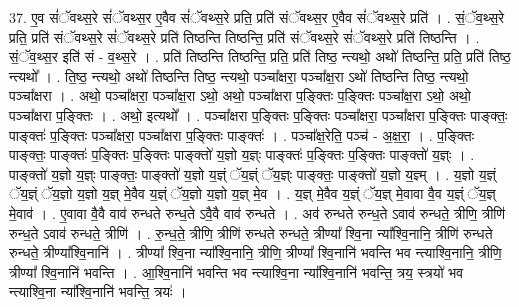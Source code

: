 \documentclass[17pt]{extarticle}
\begin{document}
37. ए॒व सं॑ॅवथ्स॒रे सं॑ॅवथ्स॒र ए॒वैव सं॑ॅवथ्स॒रे प्रति॒ प्रति॑ संॅवथ्स॒र ए॒वैव सं॑ॅवथ्स॒रे प्रति॑ । . सं॒ॅव॒थ्स॒रे प्रति॒ प्रति॑ संॅवथ्स॒रे सं॑ॅवथ्स॒रे प्रति॑ तिष्ठन्ति तिष्ठन्ति॒ प्रति॑ संॅवथ्स॒रे सं॑ॅवथ्स॒रे प्रति॑ तिष्ठन्ति । . सं॒ॅव॒थ्स॒र इति॑ सं - व॒थ्स॒रे । . प्रति॑ तिष्ठन्ति तिष्ठन्ति॒ प्रति॒ प्रति॑ तिष्ठ॒ न्त्यथो॒ अथो॑ तिष्ठन्ति॒ प्रति॒ प्रति॑ तिष्ठ॒ न्त्यथो᳚ । . ति॒ष्ठ॒ न्त्यथो॒ अथो॑ तिष्ठन्ति तिष्ठ॒ न्त्यथो॒ पञ्चा᳚क्षरा॒ पञ्चा᳚क्ष॒रा ऽथो॑ तिष्ठन्ति तिष्ठ॒ न्त्यथो॒ पञ्चा᳚क्षरा । . अथो॒ पञ्चा᳚क्षरा॒ पञ्चा᳚क्ष॒रा ऽथो॒ अथो॒ पञ्चा᳚क्षरा प॒ङ्क्तिः प॒ङ्क्तिः पञ्चा᳚क्ष॒रा ऽथो॒ अथो॒ पञ्चा᳚क्षरा प॒ङ्क्तिः । . अथो॒ इत्यथो᳚ । . पञ्चा᳚क्षरा प॒ङ्क्तिः प॒ङ्क्तिः पञ्चा᳚क्षरा॒ पञ्चा᳚क्षरा प॒ङ्क्तिः पाङ्क्तः॒ पाङ्क्तः॑ प॒ङ्क्तिः पञ्चा᳚क्षरा॒ पञ्चा᳚क्षरा प॒ङ्क्तिः पाङ्क्तः॑ । . पञ्चा᳚क्ष॒रेति॒ पञ्च॑ - अ॒क्ष॒रा॒ । . प॒ङ्क्तिः पाङ्क्तः॒ पाङ्क्तः॑ प॒ङ्क्तिः प॒ङ्क्तिः पाङ्क्तो॑ य॒ज्ञो य॒ज्ञ्ः पाङ्क्तः॑ प॒ङ्क्तिः प॒ङ्क्तिः पाङ्क्तो॑ य॒ज्ञ्ः । . पाङ्क्तो॑ य॒ज्ञो य॒ज्ञ्ः पाङ्क्तः॒ पाङ्क्तो॑ य॒ज्ञो य॒ज्ञ्ं ॅय॒ज्ञ्ं ॅय॒ज्ञ्ः पाङ्क्तः॒ पाङ्क्तो॑ य॒ज्ञो य॒ज्ञ्म् । . य॒ज्ञो य॒ज्ञ्ं ॅय॒ज्ञ्ं ॅय॒ज्ञो य॒ज्ञो य॒ज्ञ् मे॒वैव य॒ज्ञ्ं ॅय॒ज्ञो य॒ज्ञो य॒ज्ञ् मे॒व । . य॒ज्ञ् मे॒वैव य॒ज्ञ्ं ॅय॒ज्ञ् मे॒वावा वै॒व य॒ज्ञ्ं ॅय॒ज्ञ् मे॒वाव॑ । . ए॒वावा वै॒वै वाव॑ रुन्धते रुन्ध॒ते ऽवै॒वै वाव॑ रुन्धते । . अव॑ रुन्धते रुन्ध॒ते ऽवाव॑ रुन्धते॒ त्रीणि॒ त्रीणि॑ रुन्ध॒ते ऽवाव॑ रुन्धते॒ त्रीणि॑ । . रु॒न्ध॒ते॒ त्रीणि॒ त्रीणि॑ रुन्धते रुन्धते॒ त्रीण्या᳚ श्वि॒ना न्या᳚श्वि॒नानि॒ त्रीणि॑ रुन्धते रुन्धते॒ त्रीण्या᳚श्वि॒नानि॑ । . त्रीण्या᳚ श्वि॒ना न्या᳚श्वि॒नानि॒ त्रीणि॒ त्रीण्या᳚ श्वि॒नानि॑ भवन्ति भव न्त्याश्वि॒नानि॒ त्रीणि॒ त्रीण्या᳚ श्वि॒नानि॑ भवन्ति । . आ॒श्वि॒नानि॑ भवन्ति भव न्त्याश्वि॒ना न्या᳚श्वि॒नानि॑ भवन्ति॒ त्रय॒ स्त्रयो॑ भव न्त्याश्वि॒ना न्या᳚श्वि॒नानि॑ भवन्ति॒ त्रयः॑ । \newline
\end{document}
